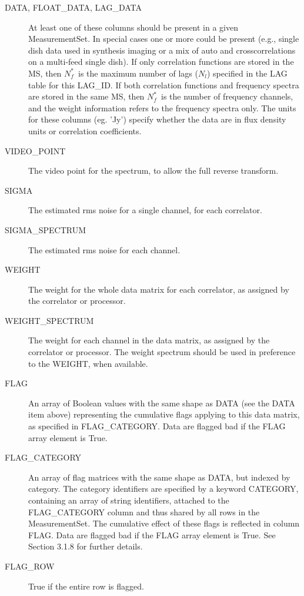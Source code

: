 \documentclass{article}
\newcommand{\nfs}{$N_f^*$}
\newcommand{\nl}{$N_l$}
\begin{document}
\begin{description}
\item[DATA, FLOAT\_DATA, LAG\_DATA] At least one of these columns
should be present in a given MeasurementSet. In special cases one or
more could be present (e.g., single dish data used in synthesis
imaging or a mix of auto and crosscorrelations on a multi-feed single
dish). If only correlation functions are stored in the MS, then \nfs\
is the maximum number of lags (\nl) specified in the LAG table for
this LAG\_ID.  If both correlation functions and frequency spectra are
stored in the same MS, then \nfs\ is the number of frequency channels,
and the weight information refers to the frequency spectra only. The
units for these columns (eg. 'Jy') specify whether the data are in
flux density units or correlation coefficients.

\item[VIDEO\_POINT] The video point for the spectrum, to allow the
full reverse transform.

\item[SIGMA] The estimated rms noise for a single channel, for
each correlator.

\item[SIGMA\_SPECTRUM] The estimated rms noise for each channel.

\item[WEIGHT] The weight for the whole data matrix for each
correlator, as assigned by the correlator or processor.

\item[WEIGHT\_SPECTRUM] The weight for each channel in the data
matrix, as assigned by the correlator or processor. The weight
spectrum should be used in preference to the WEIGHT, when available.

\item[FLAG] An array of Boolean values with the same shape as DATA
(see the DATA item above) representing the cumulative flags applying
to this data matrix, as specified in FLAG\_CATEGORY. Data are flagged
bad if the FLAG array element is True.

\item[FLAG\_CATEGORY] An array of flag matrices with the same shape as
DATA, but indexed by category. The category identifiers are specified
by a keyword CATEGORY, containing an array of string identifiers,
attached to the FLAG\_CATEGORY column and thus shared by all rows in
the MeasurementSet. The cumulative effect of these flags is reflected
in column FLAG. Data are flagged bad if the FLAG array element is
True. See Section 3.1.8 for further details.

\item[FLAG\_ROW] True if the entire row is flagged.

\end{description}
\end{document}
